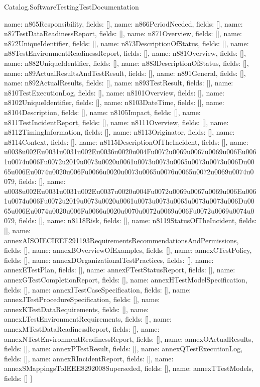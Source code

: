\begin{lexlean}{Catalog.SoftwareTestingTestDocumentation}
\begin{semanticmodule}
{    {name: n865Responsibility, fields: []},
    {name: n866PeriodNeeded, fields: []},
    {name: n87TestDataReadinessReport, fields: []},
    {name: n871Overview, fields: []},
    {name: n872UniqueIdentifier, fields: []},
    {name: n873DescriptionOfStatus, fields: []},
    {name: n88TestEnvironmentReadinessReport, fields: []},
    {name: n881Overview, fields: []},
    {name: n882UniqueIdentifier, fields: []},
    {name: n883DescriptionOfStatus, fields: []},
    {name: n89ActualResultsAndTestResult, fields: []},
    {name: n891General, fields: []},
    {name: n892ActualResults, fields: []},
    {name: n893TestResult, fields: []},
    {name: n810TestExecutionLog, fields: []},
    {name: n8101Overview, fields: []},
    {name: n8102UniqueIdentifier, fields: []},
    {name: n8103DateTime, fields: []},
    {name: n8104Description, fields: []},
    {name: n8105Impact, fields: []},
    {name: n811TestIncidentReport, fields: []},
    {name: n8111Overview, fields: []},
    {name: n8112TimingInformation, fields: []},
    {name: n8113Originator, fields: []},
    {name: n8114Context, fields: []},
    {name: n8115DescriptionOfTheIncident, fields: []},
    {name: u0038u002Eu0031u0031u002Eu0036u0020u004Fu0072u0069u0067u0069u006Eu0061u0074u006Fu0072u2019u0073u0020u0061u0073u0073u0065u0073u0073u006Du0065u006Eu0074u0020u006Fu0066u0020u0073u0065u0076u0065u0072u0069u0074u0079, fields: []},
    {name: u0038u002Eu0031u0031u002Eu0037u0020u004Fu0072u0069u0067u0069u006Eu0061u0074u006Fu0072u2019u0073u0020u0061u0073u0073u0065u0073u0073u006Du0065u006Eu0074u0020u006Fu0066u0020u0070u0072u0069u006Fu0072u0069u0074u0079, fields: []},
    {name: n8118Risk, fields: []},
    {name: n8119StatusOfTheIncident, fields: []},
    {name: annexAISOIECIEEE291193RequirementsRecommendationsAndPermissions, fields: []},
    {name: annexBOverviewOfExamples, fields: []},
    {name: annexCTestPolicy, fields: []},
    {name: annexDOrganizationalTestPractices, fields: []},
    {name: annexETestPlan, fields: []},
    {name: annexFTestStatusReport, fields: []},
    {name: annexGTestCompletionReport, fields: []},
    {name: annexHTestModelSpecification, fields: []},
    {name: annexITestCaseSpecification, fields: []},
    {name: annexJTestProcedureSpecification, fields: []},
    {name: annexKTestDataRequirements, fields: []},
    {name: annexLTestEnvironmentRequirements, fields: []},
    {name: annexMTestDataReadinessReport, fields: []},
    {name: annexNTestEnvironmentReadinessReport, fields: []},
    {name: annexOActualResults, fields: []},
    {name: annexPTestResult, fields: []},
    {name: annexQTestExecutionLog, fields: []},
    {name: annexRIncidentReport, fields: []},
    {name: annexSMappingsToIEEE8292008Superseded, fields: []},
    {name: annexTTestModels, fields: []}
  ]
}


\end{semanticmodule}
\end{lexlean}
